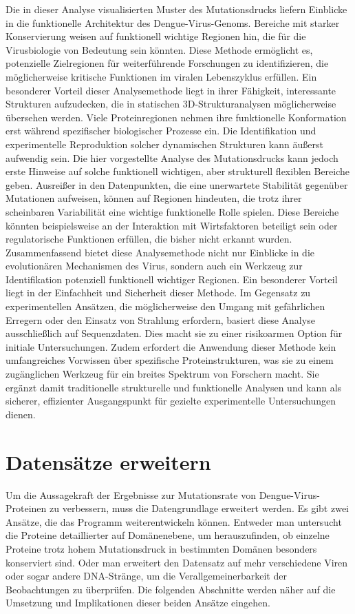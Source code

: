 \documentclass[german,version-2022-01]{uzl-thesis}
\begin{document}
Die in dieser Analyse visualisierten Muster des Mutationsdrucks liefern Einblicke in die funktionelle Architektur des Dengue-Virus-Genoms. Bereiche mit starker Konservierung weisen auf funktionell wichtige Regionen hin, die f\"ur die Virusbiologie von Bedeutung sein k\"onnten. Diese Methode erm\"oglicht es, potenzielle Zielregionen f\"ur weiterf\"uhrende Forschungen zu identifizieren, die m\"oglicherweise kritische Funktionen im viralen Lebenszyklus erf\"ullen. Ein besonderer Vorteil dieser Analysemethode liegt in ihrer F\"ahigkeit, interessante Strukturen aufzudecken, die in statischen 3D-Strukturanalysen m\"oglicherweise \"ubersehen werden. Viele Proteinregionen nehmen ihre funktionelle Konformation erst w\"ahrend spezifischer biologischer Prozesse ein. Die Identifikation und experimentelle Reproduktion solcher dynamischen Strukturen kann \"au\ss{}erst aufwendig sein. Die hier vorgestellte Analyse des Mutationsdrucks kann jedoch erste Hinweise auf solche funktionell wichtigen, aber strukturell flexiblen Bereiche geben. Ausrei\ss{}er in den Datenpunkten, die eine unerwartete Stabilit\"at gegen\"uber Mutationen aufweisen, k\"onnen auf Regionen hindeuten, die trotz ihrer scheinbaren Variabilit\"at eine wichtige funktionelle Rolle spielen. Diese Bereiche k\"onnten beispielsweise an der Interaktion mit Wirtsfaktoren beteiligt sein oder regulatorische Funktionen erf\"ullen, die bisher nicht erkannt wurden. Zusammenfassend bietet diese Analysemethode nicht nur Einblicke in die evolution\"aren Mechanismen des Virus, sondern auch ein Werkzeug zur Identifikation potenziell funktionell wichtiger Regionen. Ein besonderer Vorteil liegt in der Einfachheit und Sicherheit dieser Methode. Im Gegensatz zu experimentellen Ans\"atzen, die m\"oglicherweise den Umgang mit gef\"ahrlichen Erregern oder den Einsatz von Strahlung erfordern, basiert diese Analyse ausschlie\ss{}lich auf Sequenzdaten. Dies macht sie zu einer risikoarmen Option f\"ur initiale Untersuchungen. Zudem erfordert die Anwendung dieser Methode kein umfangreiches Vorwissen \"uber spezifische Proteinstrukturen, was sie zu einem zug\"anglichen Werkzeug f\"ur ein breites Spektrum von Forschern macht. Sie erg\"anzt damit traditionelle strukturelle und funktionelle Analysen und kann als sicherer, effizienter Ausgangspunkt f\"ur gezielte experimentelle Untersuchungen dienen.

\section{Datens\"atze erweitern}
Um die Aussagekraft der Ergebnisse zur Mutationsrate von Dengue-Virus-Proteinen zu verbessern, muss die Datengrundlage erweitert werden. Es gibt zwei Ans\"atze, die das Programm weiterentwickeln k\"onnen. Entweder man untersucht die Proteine detaillierter auf Dom\"anenebene, um herauszufinden, ob einzelne Proteine trotz hohem Mutationsdruck in bestimmten Dom\"anen besonders konserviert sind. Oder man erweitert den Datensatz auf mehr verschiedene Viren oder sogar andere DNA-Str\"ange, um die Verallgemeinerbarkeit der Beobachtungen zu \"uberpr\"ufen. Die folgenden Abschnitte werden n\"aher auf die Umsetzung und Implikationen dieser beiden Ans\"atze eingehen.
\end{document}
